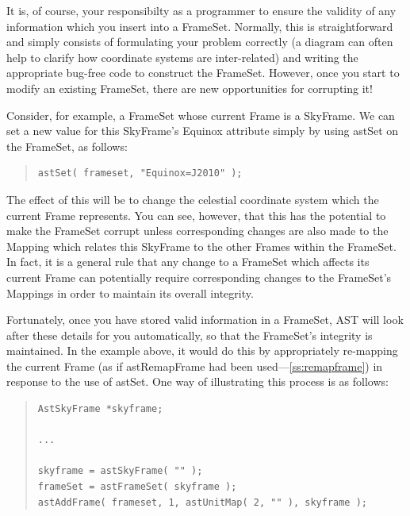 \documentclass[twoside,11pt]{article}
\newcommand{\htmlref}[2]{#1}
\newcommand{\secref}[1]{\S\ref{#1}}
\renewcommand{\secref}[1]{\ref{#1}}
\begin{document}
It is, of course, your responsibilty as a programmer to ensure the
validity of any information which you insert into a
FrameSet. Normally, this is straightforward and simply consists of
formulating your problem correctly (a diagram can often help to
clarify how coordinate systems are inter-related) and writing the
appropriate bug-free code to construct the FrameSet. However, once you
start to modify an existing FrameSet, there are new opportunities for
corrupting it!

Consider, for example, a FrameSet whose current \htmlref{Frame}{Frame} is a
\htmlref{SkyFrame}{SkyFrame}. We can set a new value for this SkyFrame's \htmlref{Equinox}{Equinox} attribute
simply by using \htmlref{astSet}{astSet} on the FrameSet, as follows:

\begin{quote}
\small
\begin{verbatim}
astSet( frameset, "Equinox=J2010" );
\end{verbatim}
\normalsize
\end{quote}

The effect of this will be to change the celestial coordinate system
which the current Frame represents. You can see, however, that this
has the potential to make the FrameSet corrupt unless corresponding
changes are also made to the Mapping which relates this SkyFrame to
the other Frames within the FrameSet. In fact, it is a general rule
that any change to a FrameSet which affects its current Frame can
potentially require corresponding changes to the FrameSet's Mappings
in order to maintain its overall integrity.

Fortunately, once you have stored valid information in a FrameSet, AST
will look after these details for you automatically, so that the
FrameSet's integrity is maintained. In the example above, it would do
this by appropriately re-mapping the current Frame (as if
\htmlref{astRemapFrame}{astRemapFrame} had been used---\secref{ss:remapframe}) in response to
the use of astSet. One way of illustrating this process is as follows:

\begin{quote}
\small
\begin{verbatim}
AstSkyFrame *skyframe;

...

skyframe = astSkyFrame( "" );
frameSet = astFrameSet( skyframe );
astAddFrame( frameset, 1, astUnitMap( 2, "" ), skyframe );
\end{verbatim}
\normalsize
\end{quote}
\end{document}
